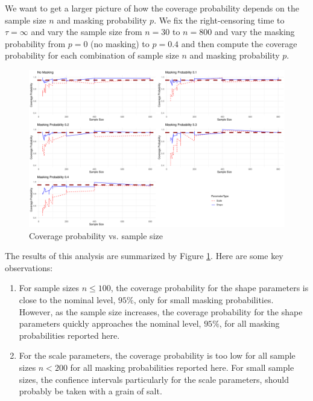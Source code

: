 \documentclass[
]{article}
\begin{document}
We want to get a larger picture of how the coverage probability depends
on the sample size \(n\) and masking probability \(p\). We fix the
right-censoring time to \(\tau = \infty\) and vary the sample size from
\(n = 30\) to \(n = 800\) and vary the masking probability from
\(p = 0\) (no masking) to \(p = 0.4\) and then compute the coverage
probability for each combination of sample size \(n\) and masking
probability \(p\).

\begin{figure}

{\centering \includegraphics{image/plot-coverage-p-vs-sample-size} 

}

\caption{Coverage probability vs. sample size}\label{fig:plot-coverage-p-vs-sample-size}
\end{figure}

The results of this analysis are summarized by Figure
\ref{fig:plot-coverage-p-vs-sample-size}. Here are some key
observations:

\begin{enumerate}
\def\labelenumi{\arabic{enumi}.}
\item
  For sample sizes \(n \leq 100\), the coverage probability for the
  shape parameters is close to the nominal level, \(95\%\), only for
  small masking probabilities. However, as the sample size increases,
  the coverage probability for the shape parameters quickly approaches
  the nominal level, \(95\%\), for all masking probabilities reported
  here.
\item
  For the scale parameters, the coverage probability is too low for all
  sample sizes \(n < 200\) for all masking probabilities reported here.
  For small sample sizes, the confience intervals particularly for the
  scale parameters, should probably be taken with a grain of salt.
\end{enumerate}
\end{document}
